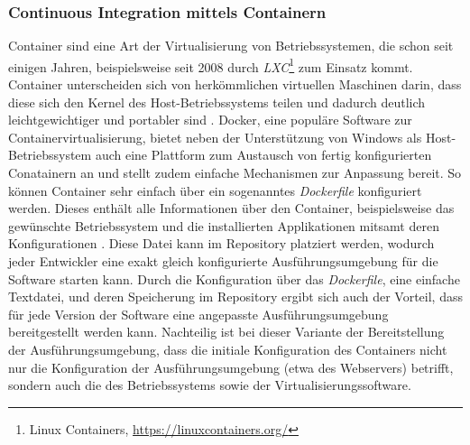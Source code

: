         \subsubsection{Continuous Integration mittels Containern}
        Container sind eine Art der Virtualisierung von Betriebssystemen, die schon seit einigen Jahren, beispielsweise 
        seit 2008 durch \textit{LXC}\footnote{Linux Containers, \url{https://linuxcontainers.org/}} zum Einsatz kommt. 
        Container unterscheiden sich von herkömmlichen virtuellen Maschinen darin, dass diese sich den Kernel des 
        Host-Betriebssystems teilen und dadurch deutlich leichtgewichtiger und portabler sind \cite{scheepers_virtualization_2014}. 
        Docker, eine populäre Software zur Containervirtualisierung, bietet neben der Unterstützung von Windows als Host-
        Betriebssystem auch eine Plattform zum Austausch von fertig konfigurierten Conatainern an und stellt zudem einfache 
        Mechanismen zur Anpassung bereit. So können Container sehr einfach über ein sogenanntes \textit{Dockerfile} konfiguriert 
        werden. Dieses enthält alle Informationen über den Container, beispielsweise das gewünschte Betriebssystem und die 
        installierten Applikationen mitsamt deren Konfigurationen \cite{anderson_docker_2015}. Diese Datei kann im Repository platziert werden, wodurch jeder 
        Entwickler eine exakt gleich konfigurierte Ausführungsumgebung für die Software starten kann. Durch die Konfiguration 
        über das \textit{Dockerfile}, eine einfache Textdatei, und deren Speicherung im Repository ergibt sich auch der Vorteil, 
        dass für jede Version der Software eine angepasste Ausführungsumgebung bereitgestellt werden kann. Nachteilig ist bei
        dieser Variante der Bereitstellung der Ausführungsumgebung, dass die initiale Konfiguration des Containers nicht nur 
        die Konfiguration der Ausführungsumgebung (etwa des Webservers) betrifft, sondern auch die des Betriebssystems sowie 
        der Virtualisierungssoftware.


